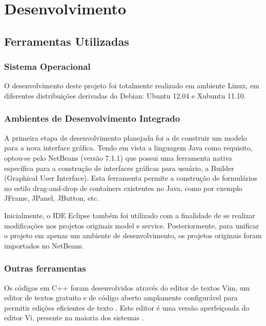 
\chapter{Desenvolvimento} %

\section{Ferramentas Utilizadas}
\subsection{Sistema Operacional}

O desenvolvimento deste projeto foi totalmente realizado em ambiente Linux, em diferentes distribuições derivadas do Debian: Ubuntu 12.04 e Xubuntu 11.10.

\subsection{Ambientes de Desenvolvimento Integrado}

A primeira etapa de desenvolvimento planejada foi a de construir um modelo para a nova interface gráfica. Tendo em vista a linguagem Java como requisito, optou-se pelo  NetBeans (versão 7.1.1) que possui uma ferramenta nativa específica para a construção de interfaces gráficas para usuário, a  Builder (Graphical User Interface). Esta ferramenta permite a construção de formulários no estilo drag-and-drop de containers existentes no Java, como por exemplo JFrame, JPanel, JButton, etc.

Inicialmente, o IDE Eclipse também foi utilizado com a finalidade de se realizar modificações nos projetos originais model e service. Posteriormente, para unificar o projeto em apenas um ambiente de desenvolvimento, os projetos originais foram importados no NetBeans.

\subsection{Outras ferramentas}

Os códigos em C++ foram desenvolvidos através do editor de textos Vim, um editor de textos gratuito e de código aberto amplamente configurável para permitir edições eficientes de texto \cite{vimabout}. Este editor é uma versão aperfeiçoada do editor Vi, presente na maioria dos sistemas .

